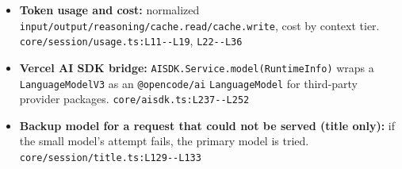 \begin{itemize}
\item \textbf{Token usage and cost:} normalized \texttt{input/\allowbreak{}output/\allowbreak{}reasoning/\allowbreak{}cache.\allowbreak{}read/\allowbreak{}cache.\allowbreak{}write}, cost by context tier. \texttt{core/\allowbreak{}session/\allowbreak{}usage.\allowbreak{}ts:\allowbreak{}L11-\allowbreak{}-\allowbreak{}L19}, \texttt{L22-\allowbreak{}-\allowbreak{}L36}
\item \textbf{Vercel AI SDK bridge:} \texttt{AISDK.\allowbreak{}Service.\allowbreak{}model(\allowbreak{}RuntimeInfo)} wraps a \texttt{LanguageModelV3} as an \texttt{@opencode/\allowbreak{}ai} \texttt{LanguageModel} for third-party provider packages. \texttt{core/\allowbreak{}aisdk.\allowbreak{}ts:\allowbreak{}L237-\allowbreak{}-\allowbreak{}L252}
\item \textbf{Backup model for a request that could not be served (title only):} if the small model's attempt fails, the primary model is tried. \texttt{core/\allowbreak{}session/\allowbreak{}title.\allowbreak{}ts:\allowbreak{}L129-\allowbreak{}-\allowbreak{}L133}
\end{itemize}

